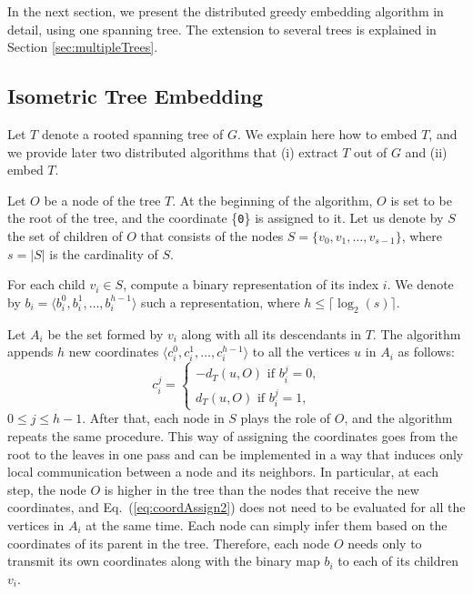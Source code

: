 \documentclass[conference]{IEEEtran}
\begin{document}
In the next section, we present the distributed greedy embedding algorithm in detail, using one spanning tree. The extension to several trees is explained in Section \ref{sec:multipleTrees}.

\subsection{Isometric Tree Embedding}
\label{sec:embedding}

Let $T$ denote a rooted spanning tree of $G$. We explain here how to embed $T$, and we provide later two distributed algorithms that (i) extract $T$ out of $G$ and (ii) embed $T$.


Let $O$ be a node of the tree $T$. At the beginning of the algorithm, $O$ is set to be the root of the tree, and the coordinate \{\texttt{0}\} is assigned to it.
Let us denote by $S$ the set of children of $O$ that consists of the nodes $S=\{v_0,v_1,\ldots,v_{s-1}\}$, where $s = |S|$ is the cardinality of $S$.

For each child $v_i \in S$, compute a binary representation of its index $i$. We denote by $b_i= \langle b_i^0,b_i^1,\ldots,b_i^{h-1} \rangle$ such a representation, where $h \leq \lceil \log_2 (s) \rceil$.

Let $A_i$ be the set formed by $v_i$ along with all its descendants in $T$. The algorithm appends $h$ new coordinates $\langle c_i^0,c_i^1,\ldots,c_i^{h-1} \rangle$ to all the vertices $u$ in $A_i$ as follows:
\begin{equation}
\label{eq:coordAssign2}
 c_i^j = \begin{cases}
          -d_T(u,O) \text{ if } b_i^j=0 \text{,}\\
	  d_T(u,O) \text{ if } b_i^j=1 \text{,}
         \end{cases}
\end{equation}
$0 \leq j \leq h-1$. After that, each node in $S$ plays the role of $O$, and the algorithm repeats the same procedure.
This way of assigning the coordinates goes from the root to the leaves in one pass and can be implemented in a way that induces only local communication between a node and its neighbors. In particular, at each step, the node $O$ is higher in the tree than the nodes that receive the new coordinates, and Eq.\ (\ref{eq:coordAssign2}) does not need to be evaluated for all the vertices in $A_i$ at the same time. Each node can simply infer them based on the coordinates of its parent in the tree. Therefore, each node $O$ needs only to transmit its own coordinates along with the binary map $b_i$ to each of its children $v_i$.
\end{document}
